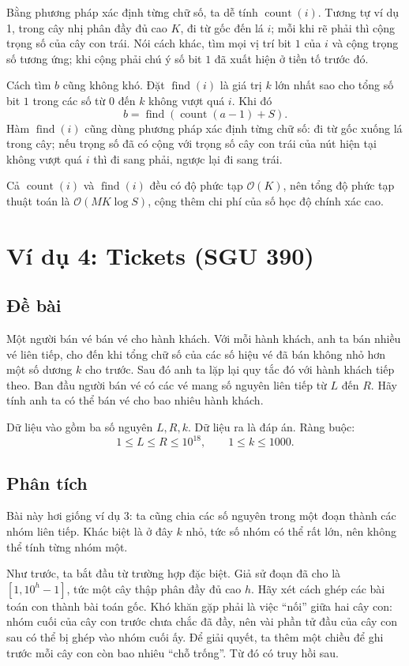 \documentclass[11pt]{article}
\newcommand{\Oh}{\mathcal{O}}
\begin{document}
Bằng phương pháp xác định từng chữ số, ta dễ tính $\operatorname{count}(i)$.
Tương tự ví dụ 1, trong cây nhị phân đầy đủ cao $K$, đi từ gốc đến lá $i$;
mỗi khi rẽ phải thì cộng trọng số của cây con trái. Nói cách khác, tìm mọi
vị trí bit $1$ của $i$ và cộng trọng số tương ứng; khi cộng phải chú ý số bit
$1$ đã xuất hiện ở tiền tố trước đó.

Cách tìm $b$ cũng không khó. Đặt $\operatorname{find}(i)$ là giá trị $k$ lớn
nhất sao cho tổng số bit $1$ trong các số từ $0$ đến $k$ không vượt quá $i$.
Khi đó
\[
  b=\operatorname{find}(\operatorname{count}(a-1)+S).
\]
Hàm $\operatorname{find}(i)$ cũng dùng phương pháp xác định từng chữ số: đi từ
gốc xuống lá trong cây; nếu trọng số đã có cộng với trọng số cây con trái của
nút hiện tại không vượt quá $i$ thì đi sang phải, ngược lại đi sang trái.

Cả $\operatorname{count}(i)$ và $\operatorname{find}(i)$ đều có độ phức tạp
$\Oh(K)$, nên tổng độ phức tạp thuật toán là $\Oh(MK\log S)$, cộng thêm chi
phí của số học độ chính xác cao.

\section{Ví dụ 4: Tickets (SGU 390)}

\subsection{Đề bài}

Một người bán vé bán vé cho hành khách. Với mỗi hành khách, anh ta bán nhiều
vé liên tiếp, cho đến khi tổng chữ số của các số hiệu vé đã bán không nhỏ hơn
một số dương $k$ cho trước. Sau đó anh ta lặp lại quy tắc đó với hành khách
tiếp theo. Ban đầu người bán vé có các vé mang số nguyên liên tiếp từ $L$ đến
$R$. Hãy tính anh ta có thể bán vé cho bao nhiêu hành khách.

Dữ liệu vào gồm ba số nguyên $L,R,k$. Dữ liệu ra là đáp án. Ràng buộc:
\[
  1\le L\le R\le 10^{18},\qquad 1\le k\le 1000.
\]

\subsection{Phân tích}

Bài này hơi giống ví dụ 3: ta cũng chia các số nguyên trong một đoạn thành các
nhóm liên tiếp. Khác biệt là ở đây $k$ nhỏ, tức số nhóm có thể rất lớn, nên
không thể tính từng nhóm một.

Như trước, ta bắt đầu từ trường hợp đặc biệt. Giả sử đoạn đã cho là
$[1,10^h-1]$, tức một cây thập phân đầy đủ cao $h$. Hãy xét cách ghép các bài
toán con thành bài toán gốc. Khó khăn gặp phải là việc ``nối'' giữa hai cây
con: nhóm cuối của cây con trước chưa chắc đã đầy, nên vài phần tử đầu của cây
con sau có thể bị ghép vào nhóm cuối ấy. Để giải quyết, ta thêm một chiều để
ghi trước mỗi cây con còn bao nhiêu ``chỗ trống''. Từ đó có truy hồi sau.
\end{document}
